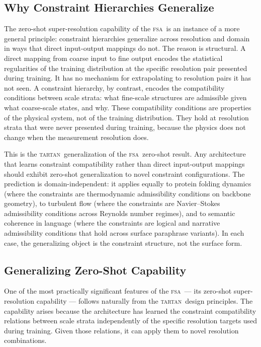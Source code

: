 \documentclass[11pt,a4paper]{article}
\theoremstyle{plain}
\theoremstyle{definition}
\theoremstyle{remark}
\newcommand{\TARTAN}{\textup{\textsc{tartan}}}
\newcommand{\FSA}{\textup{\textsc{fsa}}}
\begin{document}
\subsection{Why Constraint Hierarchies Generalize}

The zero-shot super-resolution capability of the \FSA\ is an instance of a
more general principle: constraint hierarchies generalize across resolution
and domain in ways that direct input-output mappings do not. The reason is
structural. A direct mapping from coarse input to fine output encodes the
statistical regularities of the training distribution at the specific
resolution pair presented during training. It has no mechanism for
extrapolating to resolution pairs it has not seen. A constraint hierarchy,
by contrast, encodes the compatibility conditions between scale strata: what
fine-scale structures are admissible given what coarse-scale states, and
why. These compatibility conditions are properties of the physical system,
not of the training distribution. They hold at resolution strata that were
never presented during training, because the physics does not change when
the measurement resolution does.

This is the \TARTAN\ generalization of the \FSA\ zero-shot result. Any
architecture that learns constraint compatibility rather than direct
input-output mappings should exhibit zero-shot generalization to novel
constraint configurations. The prediction is domain-independent: it applies
equally to protein folding dynamics (where the constraints are
thermodynamic admissibility conditions on backbone geometry), to turbulent
flow (where the constraints are Navier--Stokes admissibility conditions
across Reynolds number regimes), and to semantic coherence in language
(where the constraints are logical and narrative admissibility conditions
that hold across surface paraphrase variants). In each case, the
generalizing object is the constraint structure, not the surface form.

\subsection{Generalizing Zero-Shot Capability}

One of the most practically significant features of the \FSA\ --- its
zero-shot super-resolution capability --- follows naturally from the
\TARTAN\ design principles. The capability arises because the architecture
has learned the constraint compatibility relations between scale strata
independently of the specific resolution targets used during training.
Given those relations, it can apply them to novel resolution combinations.
\end{document}
